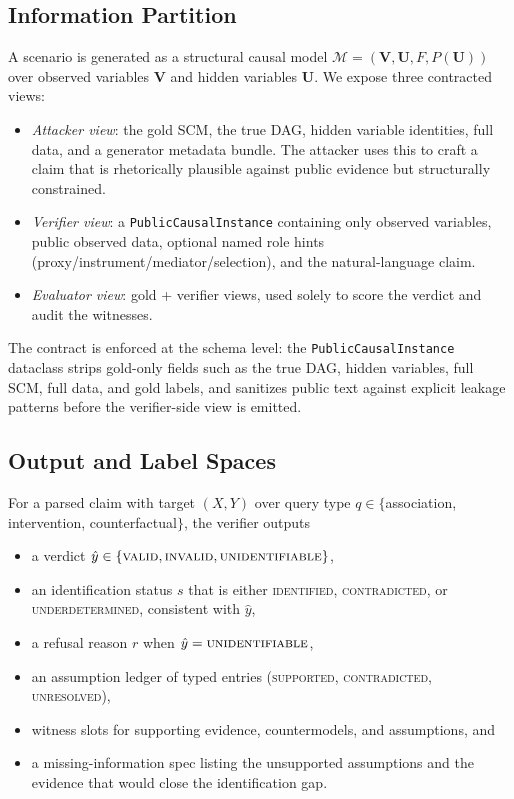 \documentclass{article}
\theoremstyle{plain}
\theoremstyle{definition}
\theoremstyle{remark}
\begin{document}
\subsection{Information Partition}
A scenario is generated as a structural causal model
$\mathcal{M} = (\mathbf{V}, \mathbf{U}, F, P(\mathbf{U}))$ over observed
variables $\mathbf{V}$ and hidden variables $\mathbf{U}$. We expose three
contracted views:

\begin{itemize}
\item \emph{Attacker view}: the gold SCM, the true DAG, hidden variable
  identities, full data, and a generator metadata bundle. The attacker uses
  this to craft a claim that is rhetorically plausible against public
  evidence but structurally constrained.
\item \emph{Verifier view}: a \texttt{PublicCausalInstance} containing only
  observed variables, public observed data, optional named role hints
  (proxy/instrument/mediator/selection), and the natural-language claim.
\item \emph{Evaluator view}: gold + verifier views, used solely to score the
  verdict and audit the witnesses.
\end{itemize}

The contract is enforced at the schema level: the
\texttt{PublicCausalInstance} dataclass strips gold-only fields such as the
true DAG, hidden variables, full SCM, full data, and gold labels, and sanitizes
public text against explicit leakage patterns before the verifier-side view is
emitted.

\subsection{Output and Label Spaces}

For a parsed claim with target $(X, Y)$ over query type
$q \in \{$association, intervention, counterfactual$\}$, the verifier outputs

\begin{itemize}
\item a verdict $\hat{y} \in \{\textsc{valid}, \textsc{invalid},
  \textsc{unidentifiable}\}$,
\item an identification status $s$ that is either \textsc{identified},
  \textsc{contradicted}, or \textsc{underdetermined}, consistent with
  $\hat{y}$,
\item a refusal reason $r$ when $\hat{y} = \textsc{unidentifiable}$,
\item an assumption ledger of typed entries
  (\textsc{supported}, \textsc{contradicted}, \textsc{unresolved}),
\item witness slots for supporting evidence, countermodels, and assumptions,
  and
\item a missing-information spec listing the unsupported assumptions and the
  evidence that would close the identification gap.
\end{itemize}
\end{document}
